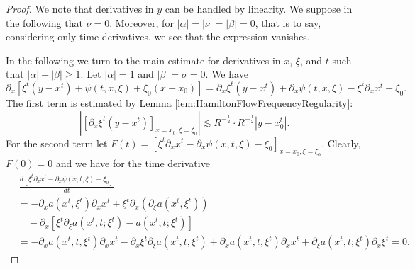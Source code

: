 \documentclass{amsart}
\theoremstyle{definition}
\begin{document}
\begin{proof}
We note that derivatives in $y$ can be handled by linearity. We suppose in the following that $\nu = 0$. Moreover, for $|\alpha|=|\nu|=|\beta|=0$, that is to say, considering only time derivatives, we see that the expression vanishes.

\smallskip

In the following we turn to the main estimate for derivatives in $x$, $\xi$, and $t$ such that $|\alpha|+|\beta| \geq 1$. Let $|\alpha| = 1$ and $|\beta| = \sigma = 0$. We have
\begin{equation*}
\partial_x [ \xi^t (y-x^t) + \psi(t,x,\xi) + \xi_0 (x-x_0)] = \partial_x \xi^t (y-x^t) + \partial_x \psi(t,x,\xi) - \xi^t \partial_x x^t + \xi_0.
\end{equation*}
The first term is estimated by Lemma \ref{lem:HamiltonFlowFrequencyRegularity}:
\begin{equation*}
| [ \partial_x \xi^t (y-x^t) ]_{x=x_0,\xi=\xi_0} | \lesssim R^{-\frac{1}{2}} \cdot R^{-\frac{1}{2}} |y-x_0^t|.
\end{equation*}
For the second term let $F(t) = [ \xi^t \partial_x x^t - \partial_x \psi(x,t,\xi) - \xi_0 ]_{x = x_0,\xi = \xi_0}$. Clearly, $F(0) = 0$ and we have for the time derivative
\begin{equation*}
\begin{split}
&\, \frac{d [\xi^t \partial_x x^t - \partial_x \psi(x,t,\xi) - \xi_0]}{dt} \\
 &= -  \partial_x a(x^t,\xi^t) \partial_x x^t + \xi^t \partial_x ( \partial_{\xi} a(x^t, \xi^t)) \\
&\quad - \partial_x [ \xi^t \partial_{\xi} a(x^t,t;\xi^t) - a(x^t,t;\xi^t)] \\
&= - \partial_x a(x^t,t,\xi^t) \partial_x x^t - \partial_x \xi^t \partial_{\xi} a(x^t,t,\xi^t) + \partial_x a(x^t,t,\xi^t) \partial_x x^t +  \partial_{\xi} a(x^t,t;\xi^t) \partial_x \xi^t = 0.
\end{split}
\end{equation*}

\medskip


\end{proof}
\end{document}

